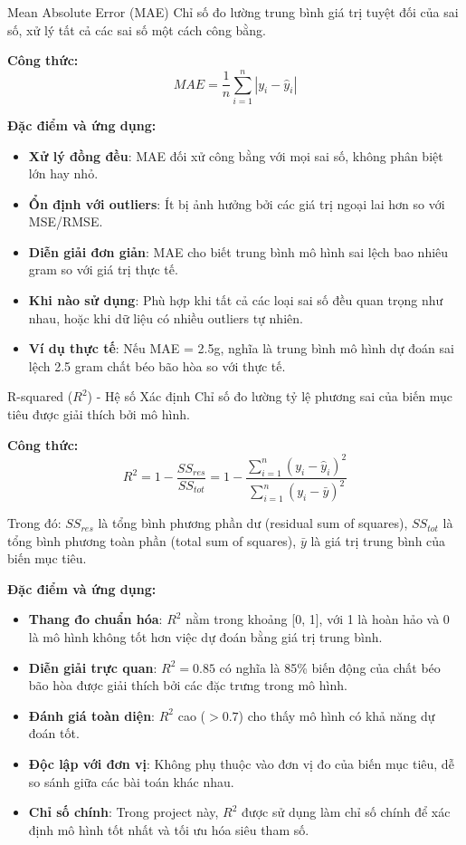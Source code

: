 \documentclass[12pt,a4paper]{article}
\begin{document}
\begin{metricsbox}{Mean Absolute Error (MAE)}
Chỉ số đo lường trung bình giá trị tuyệt đối của sai số, xử lý tất cả các sai số một cách công bằng.

\vspace{0.2cm}
\textbf{Công thức:}
\[MAE = \frac{1}{n} \sum_{i=1}^{n} |y_i - \hat{y}_i|\]

\vspace{0.2cm}
\textbf{Đặc điểm và ứng dụng:}
\begin{itemize}
    \item \textbf{Xử lý đồng đều}: MAE đối xử công bằng với mọi sai số, không phân biệt lớn hay nhỏ.
    \item \textbf{Ổn định với outliers}: Ít bị ảnh hưởng bởi các giá trị ngoại lai hơn so với MSE/RMSE.
    \item \textbf{Diễn giải đơn giản}: MAE cho biết trung bình mô hình sai lệch bao nhiêu gram so với giá trị thực tế.
    \item \textbf{Khi nào sử dụng}: Phù hợp khi tất cả các loại sai số đều quan trọng như nhau, hoặc khi dữ liệu có nhiều outliers tự nhiên.
    \item \textbf{Ví dụ thực tế}: Nếu MAE = 2.5g, nghĩa là trung bình mô hình dự đoán sai lệch 2.5 gram chất béo bão hòa so với thực tế.
\end{itemize}
\end{metricsbox}

\begin{metricsbox}{R-squared ($R^2$) - Hệ số Xác định}
Chỉ số đo lường tỷ lệ phương sai của biến mục tiêu được giải thích bởi mô hình.

\vspace{0.2cm}
\textbf{Công thức:}
\[R^2 = 1 - \frac{SS_{res}}{SS_{tot}} = 1 - \frac{\sum_{i=1}^{n} (y_i - \hat{y}_i)^2}{\sum_{i=1}^{n} (y_i - \bar{y})^2}\]

Trong đó: $SS_{res}$ là tổng bình phương phần dư (residual sum of squares), $SS_{tot}$ là tổng bình phương toàn phần (total sum of squares), $\bar{y}$ là giá trị trung bình của biến mục tiêu.

\vspace{0.2cm}
\textbf{Đặc điểm và ứng dụng:}
\begin{itemize}
    \item \textbf{Thang đo chuẩn hóa}: $R^2$ nằm trong khoảng [0, 1], với 1 là hoàn hảo và 0 là mô hình không tốt hơn việc dự đoán bằng giá trị trung bình.
    \item \textbf{Diễn giải trực quan}: $R^2 = 0.85$ có nghĩa là 85\% biến động của chất béo bão hòa được giải thích bởi các đặc trưng trong mô hình.
    \item \textbf{Đánh giá toàn diện}: $R^2$ cao ($> 0.7$) cho thấy mô hình có khả năng dự đoán tốt.
    \item \textbf{Độc lập với đơn vị}: Không phụ thuộc vào đơn vị đo của biến mục tiêu, dễ so sánh giữa các bài toán khác nhau.
    \item \textbf{Chỉ số chính}: Trong project này, $R^2$ được sử dụng làm chỉ số chính để xác định mô hình tốt nhất và tối ưu hóa siêu tham số.
\end{itemize}
\end{metricsbox}
\end{document}
